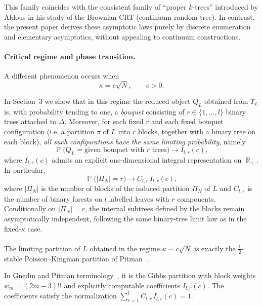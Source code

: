 \documentclass[11pt]{article}
\DeclareMathOperator{\RR}{\mathbb{R}}
\DeclareMathOperator{\PP}{\mathbb{P}}
\begin{document}
This family coincides with the consistent family of
``proper $k$-trees'' introduced by Aldous in his study of 
the Brownian CRT (continuum random tree).
In contrast, the present paper derives these asymptotic laws
purely by discrete enumeration and elementary asymptotics,
without appealing to continuum constructions.

\medskip

 \paragraph{Critical regime and phase transition.}
A different phenomenon occurs when
\[
\kappa = c\sqrt N, \qquad c>0.
\]


In Section~3 we show that in this regime the reduced object $Q_L$
obtained from $\Upsilon_L$ is, with probability tending to one, a \emph{bouquet}
consisting of $r\in\{1,\dots,l\}$ binary trees attached to $\Delta$.
Moreover, for each fixed $r$ and each fixed bouquet configuration
(i.e. a partition $\pi$ of $L$ into $r$ blocks, together with a binary tree on each block),
\emph{all such configurations have the same limiting probability}, namely
\[
\PP\bigl(Q_L=\text{given bouquet with $r$ trees}\bigr)
\longrightarrow
I_{l,r}(c),
\]
where $I_{l,r}(c)$ admits an explicit one-dimensional integral representation on $\RR_+$.
In particular,
\[
\PP\bigl(|\Pi_N|=r\bigr)\longrightarrow C_{l,r}\,I_{l,r}(c),
\]
where $|\Pi_N|$ is the number of blocks of the induced partition $\Pi_N$ of $L$ and
$C_{l,r}$ is the number of binary forests on $l$ labelled leaves with $r$ components.
Conditionally on $|\Pi_N|=r$, 
the internal subtrees defined by the blocks remain asymptotically independent,
following the same binary-tree limit law as in the fixed-$\kappa$ case.
\paragraph{}
The limiting partition of \(L\) obtained in the regime
\(\kappa\sim c\sqrt N\) is exactly the \(\tfrac12\)-stable
Poisson--Kingman partition of Pitman~\cite{Pitman2003PK}.

 In Gnedin and Pitman terminology~\cite{GnedinPitman2006},
it is the Gibbs partition with block weights $w_m=(2m-3)!!$
and explicitly computable coefficients $I_{l,r}(c)$. The coefficients satisfy the normalization $\sum_{r=1}^l C_{l,r}\,I_{l,r}(c)=1$.\\
\end{document}
